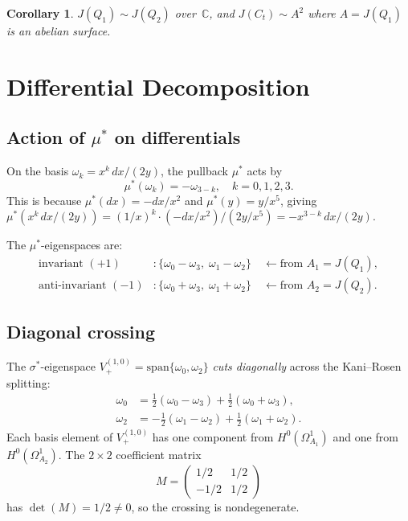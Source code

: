 \documentclass[11pt]{article}
\theoremstyle{plain}
\newtheorem{corollary}[theorem]{Corollary}
\theoremstyle{definition}
\theoremstyle{remark}
\newcommand{\C}{\mathbb{C}}
\begin{document}
\begin{corollary}\label{cor:A2}
$J(Q_1) \sim J(Q_2)$ over~$\C$, and $J(C_t) \sim A^2$ where
$A = J(Q_1)$ is an abelian surface.
\end{corollary}

\section{Differential Decomposition}
\label{sec:differential}

\subsection{Action of $\mu^*$ on differentials}

On the basis $\omega_k = x^k\,dx/(2y)$, the pullback $\mu^*$
acts by
\[
  \mu^*(\omega_k) = -\omega_{3-k}, \quad k = 0,1,2,3.
\]
This is because $\mu^*(dx) = -dx/x^2$ and $\mu^*(y) = y/x^5$,
giving $\mu^*(x^k\,dx/(2y)) = (1/x)^k \cdot (-dx/x^2) / (2y/x^5)
= -x^{3-k}\,dx/(2y)$.

The $\mu^*$-eigenspaces are:
\begin{align*}
  \text{invariant } (+1)&\colon \{\omega_0 - \omega_3,\; \omega_1 - \omega_2\}
    \quad \leftarrow \text{from } A_1 = J(Q_1), \\
  \text{anti-invariant } (-1)&\colon \{\omega_0 + \omega_3,\; \omega_1 + \omega_2\}
    \quad \leftarrow \text{from } A_2 = J(Q_2).
\end{align*}

\subsection{Diagonal crossing}

The $\sigma^*$-eigenspace $V_+^{(1,0)} = \mathrm{span}\{\omega_0, \omega_2\}$
\emph{cuts diagonally} across the Kani--Rosen splitting:
\begin{align*}
  \omega_0 &= \tfrac{1}{2}(\omega_0 - \omega_3) + \tfrac{1}{2}(\omega_0 + \omega_3), \\
  \omega_2 &= -\tfrac{1}{2}(\omega_1 - \omega_2) + \tfrac{1}{2}(\omega_1 + \omega_2).
\end{align*}
Each basis element of $V_+^{(1,0)}$ has one component from $H^0(\Omega^1_{A_1})$
and one from $H^0(\Omega^1_{A_2})$.  The $2 \times 2$ coefficient matrix
\[
  M = \begin{pmatrix} 1/2 & 1/2 \\ -1/2 & 1/2 \end{pmatrix}
\]
has $\det(M) = 1/2 \neq 0$, so the crossing is nondegenerate.
\end{document}
